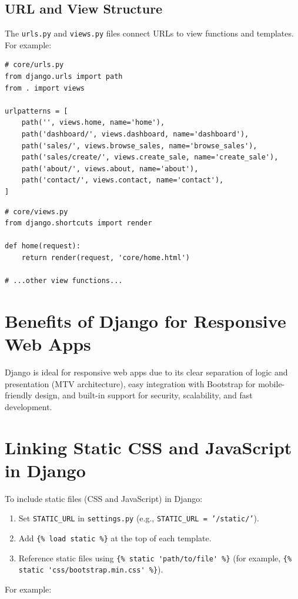 \documentclass[12pt]{article}
\begin{document}
\subsection{URL and View Structure}
The \texttt{urls.py} and \texttt{views.py} files connect URLs to view functions and templates. For example:

\begin{verbatim}
# core/urls.py
from django.urls import path
from . import views

urlpatterns = [
    path('', views.home, name='home'),
    path('dashboard/', views.dashboard, name='dashboard'),
    path('sales/', views.browse_sales, name='browse_sales'),
    path('sales/create/', views.create_sale, name='create_sale'),
    path('about/', views.about, name='about'),
    path('contact/', views.contact, name='contact'),
]
\end{verbatim}

\begin{verbatim}
# core/views.py
from django.shortcuts import render

def home(request):
    return render(request, 'core/home.html')

# ...other view functions...
\end{verbatim}

\section{Benefits of Django for Responsive Web Apps}
Django is ideal for responsive web apps due to its clear separation of logic and presentation 
(MTV architecture), easy integration with Bootstrap for mobile-friendly design, and built-in 
support for security, scalability, and fast development.

\section{Linking Static CSS and JavaScript in Django}
To include static files (CSS and JavaScript) in Django:
\begin{enumerate}
    \item Set \texttt{STATIC\_URL} in \texttt{settings.py} (e.g., \texttt{STATIC\_URL = '/static/'}).
    \item Add \verb|{% load static %}| at the top of each template.
    \item Reference static files using \verb|{% static 'path/to/file' %}| 
    (for example, \verb|{% static 'css/bootstrap.min.css' %}|).
\end{enumerate}
For example:
\end{document}

